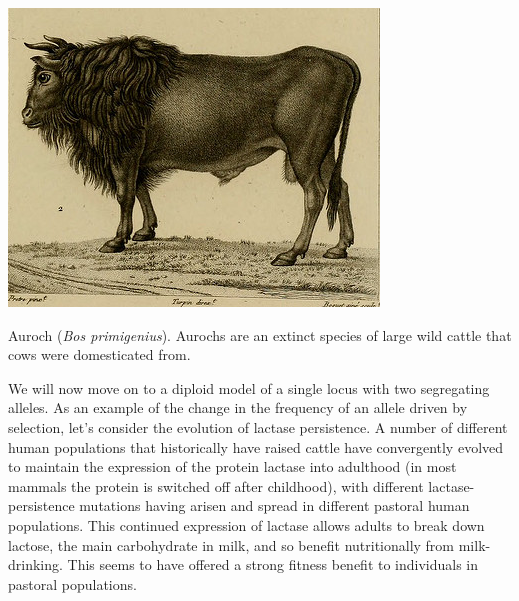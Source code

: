 \begin{marginfigure}
\begin{center}
\includegraphics[width= \textwidth]{illustration_images/single_locus_selection/cow_auroch/auroch.png}
\end{center}
\caption{Auroch ({\it Bos primigenius}). Aurochs are an extinct species of large wild cattle that cows
  were domesticated from. } \label{fig:auroch}
\end{marginfigure}
We will now move on to a diploid model of a single locus with two segregating alleles. As an example of the change in the frequency of an allele driven by selection, let's consider the evolution of lactase persistence. A number of different human populations that historically have raised cattle have convergently evolved to maintain the expression of the protein lactase into adulthood (in most mammals the protein is switched off after childhood), with different lactase-persistence mutations having arisen and spread in different pastoral human populations. 
This continued expression of lactase allows adults to break down lactose, the main carbohydrate in milk, and so benefit nutritionally from milk-drinking. This seems to have offered a strong fitness benefit to individuals in pastoral populations. 


